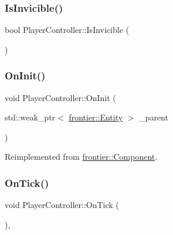 \mbox{\label{class_player_controller_a8cd8a56ee0332aebb447db6a691aa639}} 
\subsubsection{\texorpdfstring{Is\+Invicible()}{IsInvicible()}}
{\footnotesize\ttfamily bool Player\+Controller\+::\+Is\+Invicible (\begin{DoxyParamCaption}{ }\end{DoxyParamCaption})}

\mbox{\label{class_player_controller_a22c60d9e4464ee585f3592593f14bc50}} 
\subsubsection{\texorpdfstring{On\+Init()}{OnInit()}}
{\footnotesize\ttfamily void Player\+Controller\+::\+On\+Init (\begin{DoxyParamCaption}\item[{std\+::weak\+\_\+ptr$<$ \hyperlink{classfrontier_1_1_entity}{frontier\+::\+Entity} $>$}]{\+\_\+parent }\end{DoxyParamCaption})\hspace{0.3cm}{\ttfamily [virtual]}}



Reimplemented from \hyperlink{classfrontier_1_1_component_af3da02905c4d79219d9b12f260a35ad1}{frontier\+::\+Component}.

\mbox{\label{class_player_controller_a5641058df338563ff6bb6bce7645ef7b}} 
\subsubsection{\texorpdfstring{On\+Tick()}{OnTick()}}
{\footnotesize\ttfamily void Player\+Controller\+::\+On\+Tick (\begin{DoxyParamCaption}{ }\end{DoxyParamCaption})\hspace{0.3cm}{\ttfamily [override]}, {\ttfamily [virtual]}}



